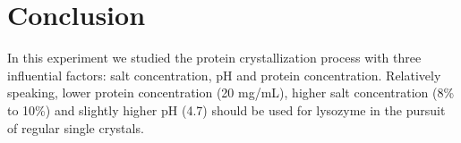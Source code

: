 \documentclass[UTF-8]{article}
\begin{document}
\section{Conclusion}
In this experiment we studied the protein crystallization process with three influential factors: salt concentration, pH and protein concentration.
Relatively speaking, lower protein concentration (20 mg/mL), higher salt concentration (8\% to 10\%) and slightly higher pH (4.7) should be used for lysozyme in the pursuit of regular single crystals.






\end{document}
